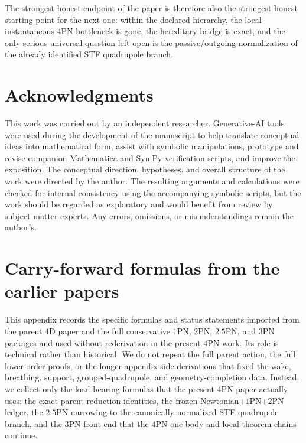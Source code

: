 \documentclass[11pt]{article}
\begin{document}
The strongest honest endpoint of the paper is therefore also the strongest
honest starting point for the next one: within the declared hierarchy, the
local instantaneous $4$PN bottleneck is gone, the hereditary bridge is exact,
and the only serious universal question left open is the passive/outgoing
normalization of the already identified STF quadrupole branch.

\section*{Acknowledgments}
This work was carried out by an independent researcher.
Generative-AI tools were used during the development of the manuscript to help
translate conceptual ideas into mathematical form, assist with symbolic
manipulations, prototype and revise companion Mathematica and SymPy
verification scripts, and improve the exposition.
The conceptual direction, hypotheses, and overall structure of the work were
directed by the author.
The resulting arguments and calculations were checked for internal consistency
using the accompanying symbolic scripts, but the work should be regarded as
exploratory and would benefit from review by subject-matter experts.
Any errors, omissions, or misunderstandings remain the author's.



\appendix


\section{Carry-forward formulas from the earlier papers}
\label{app:carry-forward}

This appendix records the specific formulas and status statements imported from
 the parent $4$D paper and the full conservative $1$PN, $2$PN, $2.5$PN, and
 $3$PN packages and used without rederivation in the present $4$PN work.  Its
 role is technical rather than historical.  We do not repeat the full parent
 action, the full lower-order proofs, or the longer appendix-side derivations
 that fixed the wake, breathing, support, grouped-quadrupole, and
 geometry-completion data.  Instead, we collect only the load-bearing formulas
 that the present $4$PN paper actually uses: the exact parent reduction
 identities, the frozen Newtonian+$1$PN+$2$PN ledger, the $2.5$PN narrowing to
 the canonically normalized STF quadrupole branch, and the $3$PN front end that
 the $4$PN one-body and local theorem chains continue.
\end{document}
